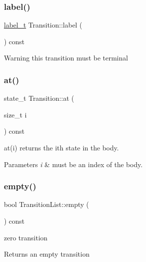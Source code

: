\subsubsection{\texorpdfstring{label()}{label()}}
{\footnotesize\ttfamily \mbox{\hyperlink{group__output_ga22fde970e635fcf63962743b2d5c441d}{label\+\_\+t}} Transition\+::label (\begin{DoxyParamCaption}{ }\end{DoxyParamCaption}) const}

\begin{DoxyWarning}{Warning}
this transition must be terminal 
\end{DoxyWarning}
\mbox{\label{group__schemata_ga9e2e243bfa147bafd947f2cffd1da3ec}} 
\subsubsection{\texorpdfstring{at()}{at()}}
{\footnotesize\ttfamily state\+\_\+t Transition\+::at (\begin{DoxyParamCaption}\item[{size\+\_\+t}]{i }\end{DoxyParamCaption}) const}



at(i) returns the ith state in the body. 


\begin{DoxyParams}{Parameters}
{\em i} & must be an index of the body. \\
\hline
\end{DoxyParams}
\mbox{\label{group__schemata_gaba83dbc74a223a80ad7f8776847bd6c2}} 
\subsubsection{\texorpdfstring{empty()}{empty()}}
{\footnotesize\ttfamily bool Transition\+List\+::empty (\begin{DoxyParamCaption}{ }\end{DoxyParamCaption}) const}



zero transition 

\begin{DoxyReturn}{Returns}
an empty transition 
\end{DoxyReturn}
\mbox{\label{group__schemata_gaa719dbdab17047360e889910795a07f2}} 
